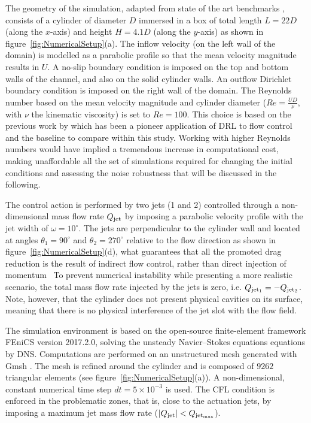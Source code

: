The geometry of the simulation, adapted from state of the art benchmarks \citep{schafer_benchmark_1996}, consists of a cylinder of diameter $D$ immersed in a box of total length $L=22D$ (along the $x$-axis) and height $H=4.1D$ (along the $y$-axis) as shown in figure~\ref{fig:NumericalSetup}(a). The inflow velocity (on the left wall of the domain) is modelled as a parabolic profile so that the mean velocity magnitude results in $U$.
A no-slip boundary condition is imposed on the top and bottom walls of the channel, and also on the solid cylinder walls. An outflow Dirichlet boundary condition is imposed on the right wall of the domain. The Reynolds number based on the mean velocity magnitude and cylinder diameter ($Re=\frac{{U} D}{\nu}$, with $\nu$ the kinematic viscosity) is set to $Re=100$. This choice is based on the previous work by \citet{rabault2019JFM} which has been a pioneer application
of DRL to flow control and the baseline to compare within this study. Working with higher Reynolds numbers would have implied a tremendous increase in computational cost, making unaffordable all the set of simulations required for changing the initial conditions and assessing the noise robustness that will be discussed in the following.

The control action is performed by two jets (1 and 2) controlled through a non-dimensional mass flow rate $Q_{\rm jet}$ by imposing a parabolic velocity profile with the jet width of $\omega = 10^\circ$. The jets are perpendicular to the cylinder wall and located at angles $\theta_1 = 90^\circ$ and $\theta_2 = 270^\circ$ relative to the flow direction as shown in figure~\ref{fig:NumericalSetup}(d), what guarantees that all the promoted drag reduction is the result of indirect flow control, rather than direct injection of momentum~\citep{rabault2019JFM} To prevent numerical instability while presenting a more realistic scenario, the total mass flow rate injected by the jets is zero, i.e. $Q_{\rm jet_1} = -Q_{\rm jet_2}$. Note, however, that the cylinder does not present physical cavities on its surface, meaning that there is no physical interference of the jet slot with the flow field.

The simulation environment is based on the open-source finite-element framework FEniCS \citep{logg2012book} version 2017.2.0, solving the unsteady Navier–Stokes equations equations by DNS.  Computations are performed on an unstructured mesh generated with Gmsh \citep{geuzaine2009gmsh}. The mesh is refined around the cylinder and is composed of $9262$ triangular elements (see figure~\ref{fig:NumericalSetup}(a)). A non-dimensional, constant numerical time step $dt=5 \times 10^{-3}$ is used. The CFL condition is enforced in the problematic zones, that is, close to the actuation jets, by imposing a maximum jet mass flow rate ($|Q_{\rm jet}|<Q_{\rm jet_{max}}$). %

